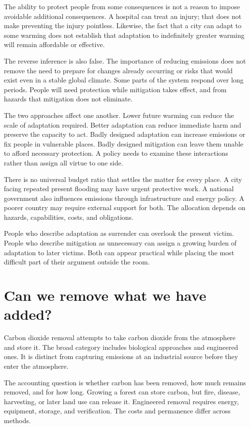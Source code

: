 \documentclass[12pt,a4paper]{book}
\begin{document}
The ability to protect people from some consequences is not a reason to impose avoidable additional consequences. A hospital can treat an injury; that does not make preventing the injury pointless. Likewise, the fact that a city can adapt to some warming does not establish that adaptation to indefinitely greater warming will remain affordable or effective.

The reverse inference is also false. The importance of reducing emissions does not remove the need to prepare for changes already occurring or risks that would exist even in a stable global climate. Some parts of the system respond over long periods. People will need protection while mitigation takes effect, and from hazards that mitigation does not eliminate.

The two approaches affect one another. Lower future warming can reduce the scale of adaptation required. Better adaptation can reduce immediate harm and preserve the capacity to act. Badly designed adaptation can increase emissions or fix people in vulnerable places. Badly designed mitigation can leave them unable to afford necessary protection. A policy needs to examine these interactions rather than assign all virtue to one side.

There is no universal budget ratio that settles the matter for every place. A city facing repeated present flooding may have urgent protective work. A national government also influences emissions through infrastructure and energy policy. A poorer country may require external support for both. The allocation depends on hazards, capabilities, costs, and obligations.

People who describe adaptation as surrender can overlook the present victim. People who describe mitigation as unnecessary can assign a growing burden of adaptation to later victims. Both can appear practical while placing the most difficult part of their argument outside the room.

\section*{Can we remove what we have added?}

Carbon dioxide removal attempts to take carbon dioxide from the atmosphere and store it. The broad category includes biological approaches and engineered ones. It is distinct from capturing emissions at an industrial source before they enter the atmosphere.

The accounting question is whether carbon has been removed, how much remains removed, and for how long. Growing a forest can store carbon, but fire, disease, harvesting, or later land use can release it. Engineered removal requires energy, equipment, storage, and verification. The costs and permanence differ across methods.
\end{document}
